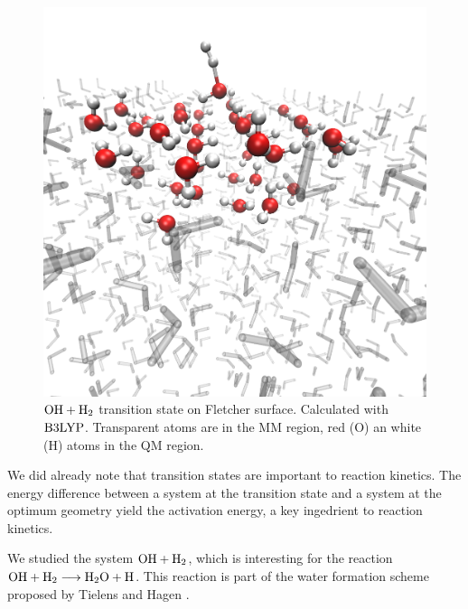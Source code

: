 \documentclass[8.5pt,twoside,twocolumn]{article}
\theoremstyle{standard}
\begin{document}
\begin{figure}[b!]
\includegraphics[width=.49\textwidth]{./img/FletcherAdsorption.png}
\caption{$\mbox{\ensuremath{\text O \text H+\text H_2}}$ transition state on Fletcher surface. Calculated with $\text{B3LYP}$.
Transparent atoms are in the MM region, red (O) an white (H) atoms in the QM
region.}
\label{Fig:Adv:TS}
\end{figure}

We did already note that transition states are important to reaction kinetics.
The energy difference between a system at the transition state and a system at
the optimum geometry yield the activation energy, a key ingedrient to reaction
kinetics.

We studied the system $\mbox{\ensuremath{\text O \text H+\text H_2}}$, which is interesting for the reaction
\mbox{$\mbox{\ensuremath{\text O \text H+\text H_2}}\longrightarrow\text H _2 \text O+\text H$}. This reaction is part of the water
formation scheme proposed by Tielens and Hagen \cite{TielensHagen1982}.
\end{document}
